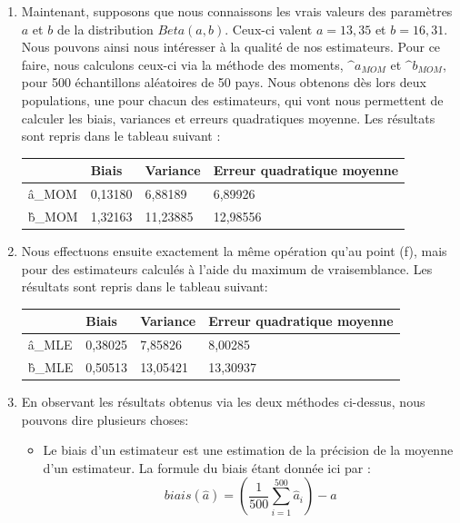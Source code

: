 \documentclass[a4paper, 11pt]{article}
\begin{document}
\begin{enumerate}[label=(\alph*)]
    \item Maintenant, supposons que nous connaissons les vrais valeurs des paramètres $a$ et $b$ de la distribution $Beta(a,b)$. Ceux-ci valent $a=13,35$ et $b=16,31$. Nous pouvons ainsi nous intéresser à la qualité de nos estimateurs. Pour ce faire, nous calculons ceux-ci via la méthode des moments, $\^a_{MOM}$ et $\^b_{MOM}$, pour 500 échantillons aléatoires de 50 pays. Nous obtenons dès lors deux populations, une pour chacun des estimateurs, qui vont nous permettent de calculer les biais, variances et erreurs quadratiques moyenne. Les résultats sont repris dans le tableau suivant :
    \begin{center}
    \begin{tabular}{|p{1.5cm}||p{3.5cm}|p{3.5cm}|p{3.5cm}|}
    \hline
         & \textbf{Biais} & \textbf{Variance} & \textbf{Erreur quadratique moyenne} \\
         \hline \hline
      \^a_{MOM} & 0,13180 & 6,88189 & 6,89926  \\
      \hline
      \^b_{MOM} & 1,32163 & 11,23885 & 12,98556 
      \\ 
      \hline
    \end{tabular}
    \end{center}
    \item Nous effectuons ensuite exactement la même opération qu'au point (f), mais pour des estimateurs calculés à l'aide du maximum de vraisemblance. Les résultats sont repris dans le tableau suivant:
       \begin{center}
    \begin{tabular}{|p{1.5cm}||p{3.5cm}|p{3.5cm}|p{3.5cm}|}
    \hline
         & \textbf{Biais} & \textbf{Variance} & \textbf{Erreur quadratique moyenne} \\
         \hline \hline
      \^a_{MLE}   & 0,38025 & 7,85826 & 8,00285 \\
      \hline
      \^b_{MLE} & 0,50513 & 13,05421 & 13,30937 \\
      \hline
    \end{tabular}
    \end{center}
    \item En observant les résultats obtenus via les deux méthodes ci-dessus, nous pouvons dire plusieurs choses:
    \begin{itemize}
        \item Le biais d'un estimateur est une estimation de la précision de la moyenne d'un estimateur. La formule du biais étant donnée ici par :
        $$biais(\hat{a})= \left(\frac{1}{500}\sum^{500}_{i=1} \hat{a}_i \right)-a$$

\end{itemize}
\end{enumerate}
\end{document}
